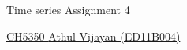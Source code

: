 \documentclass[11pt,paper=a4,answers]{exam}
\begin{document}
\noindent
\begin{minipage}[l]{.1\textwidth}%
\noindent
\end{minipage}
\hfill
\begin{minipage}[r]{.68\textwidth}%
\begin{center}
{\large \bfseries \par
\Large Time series Assignment 4 \\[2pt]
\vspace{6pt}
\small   \par}
\end{center}
\end{minipage}
\begin{minipage}[l]{.195\textwidth}%
\noindent
{\footnotesize}
\end{minipage}
\par
\noindent
\uline{CH5350 \hfill \normalsize\emph \hfill       Athul Vijayan (ED11B004)}\\
\end{document}
